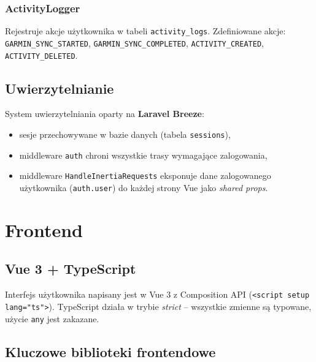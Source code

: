 \documentclass[12pt,a4paper]{report}
\begin{document}
\subsubsection{ActivityLogger}

Rejestruje akcje użytkownika w tabeli \texttt{activity\_logs}. Zdefiniowane akcje:
\texttt{GARMIN\_SYNC\_STARTED}, \texttt{GARMIN\_SYNC\_COMPLETED}, \texttt{ACTIVITY\_CREATED}, \texttt{ACTIVITY\_DELETED}.

\subsection{Uwierzytelnianie}

System uwierzytelniania oparty na \textbf{Laravel Breeze}:
\begin{itemize}[noitemsep]
    \item sesje przechowywane w bazie danych (tabela \texttt{sessions}),
    \item middleware \texttt{auth} chroni wszystkie trasy wymagające zalogowania,
    \item middleware \texttt{HandleInertiaRequests} eksponuje dane zalogowanego użytkownika (\texttt{auth.user}) do każdej strony Vue jako \textit{shared props}.
\end{itemize}

\section{Frontend}

\subsection{Vue 3 + TypeScript}

Interfejs użytkownika napisany jest w Vue 3 z Composition API (\texttt{<script setup lang="ts">}). TypeScript działa w trybie \textit{strict} -- wszystkie zmienne są typowane, użycie \texttt{any} jest zakazane.

\subsection{Kluczowe biblioteki frontendowe}
\end{document}
